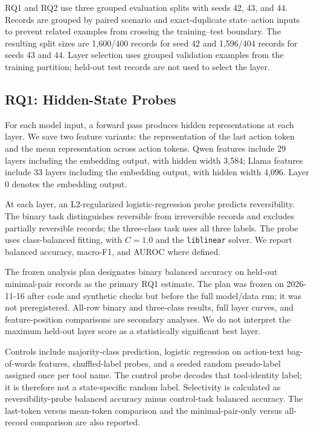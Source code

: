 \documentclass[conference]{IEEEtran}
\begin{document}
RQ1 and RQ2 use three grouped evaluation splits with seeds 42, 43, and
44. Records are grouped by paired scenario and exact-duplicate
state--action inputs to prevent related examples from crossing the
training--test boundary. The resulting split sizes are 1,600/400 records
for seed 42 and 1,596/404 records for seeds 43 and 44. Layer selection
uses grouped validation examples from the training partition; held-out
test records are not used to select the layer.

\subsection{RQ1: Hidden-State Probes}
For each model input, a forward pass produces hidden representations at each layer. We save two feature variants: the representation of the last action token and the mean representation across action tokens. Qwen features include 29 layers including the embedding output, with hidden width 3,584; Llama features include 33 layers including the embedding output, with hidden width 4,096. Layer 0 denotes the embedding output.

At each layer, an L2-regularized logistic-regression probe predicts
reversibility. The binary task distinguishes reversible from irreversible
records and excludes partially reversible records; the three-class task uses
all three labels. The probe uses class-balanced fitting, with $C=1.0$ and the
\texttt{liblinear} solver. We report balanced accuracy, macro-F1, and AUROC
where defined.

The frozen analysis plan designates binary balanced accuracy on held-out
minimal-pair records as the primary RQ1 estimate. The plan was frozen on
2026-11-16 after code and synthetic checks but before the full model/data run;
it was not preregistered. All-row binary and three-class results, full layer
curves, and feature-position comparisons are secondary analyses. We do not
interpret the maximum held-out layer score as a statistically significant best
layer.

Controls include majority-class prediction, logistic regression on action-text
bag-of-words features, shuffled-label probes, and a seeded random pseudo-label
assigned once per tool name. The control probe decodes that tool-identity
label; it is therefore not a state-specific random label. Selectivity is
calculated as reversibility-probe balanced accuracy minus control-task
balanced accuracy. The last-token versus mean-token comparison and the
minimal-pair-only versus all-record comparison are also reported.
\end{document}
